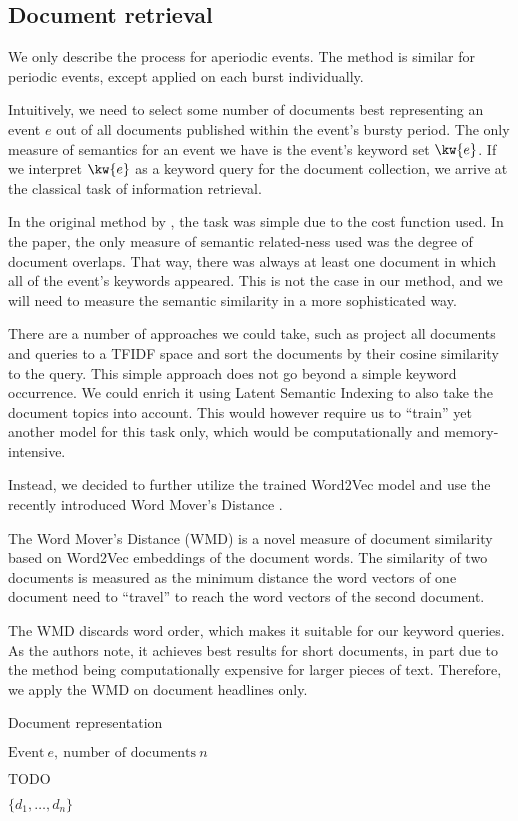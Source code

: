 \begin{enumerate}
\section{Document retrieval}
We only describe the process for aperiodic events. The method is similar for periodic events, except applied on each burst individually.

Intuitively, we need to select some number of documents best representing an event $e$ out of all documents published within the event's bursty period. The only measure of semantics for an event we have is the event's keyword set $\kw{e}$. If we interpret $\kw{e}$ as a keyword query for the document collection, we arrive at the classical task of information retrieval.

In the original method by \cite{event-detection}, the task was simple due to the cost function used. In the paper, the only measure of semantic related-ness used was the degree of document overlaps. That way, there was always at least one document in which all of the event's keywords appeared. This is not the case in our method, and we will need to measure the semantic similarity in a more sophisticated way.

There are a number of approaches we could take, such as project all documents and queries to a TFIDF space \cite{information-retrieval} and sort the documents by their cosine similarity to the query. This simple approach does not go beyond a simple keyword occurrence. We could enrich it using Latent Semantic Indexing \cite{lsi} to also take the document topics into account. This would however require us to ``train'' yet another model for this task only, which would be computationally and memory-intensive.

Instead, we decided to further utilize the trained Word2Vec model and use the recently introduced Word Mover's Distance \cite{wmd}.

The Word Mover's Distance (WMD) is a novel measure of document similarity based on Word2Vec embeddings of the document words. The similarity of two documents is measured as the minimum distance the word vectors of one document need to ``travel'' to reach the word vectors of the second document.

The WMD discards word order, which makes it suitable for our keyword queries. As the authors note, it achieves best results for short documents, in part due to the method being computationally expensive for larger pieces of text. Therefore, we apply the WMD on document headlines only.

\begin{algorithm}[H]
\begin{algorithmic}[1]
\caption{Document representation}
\Input $\text{Event}\ e,\ \text{number of documents}\ n$

\State $\text{TODO}$

\Output $\{ d_{1}, \dots, d_{n} \}$
\end{algorithmic}
\end{algorithm}

\end{enumerate}